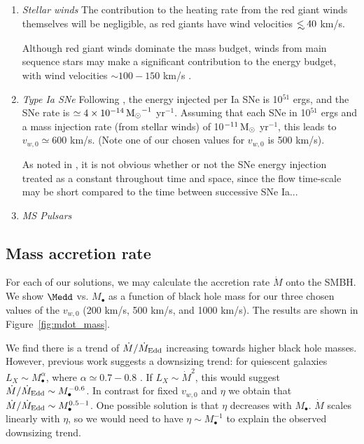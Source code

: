 \documentclass[usenatbib,fleqn]{mn2e}
\newcommand{\eddr}{\dot{M}/\dot{M}_{\rm Edd}}
\newcommand\lsim{\mathrel{\rlap{\lower4pt\hbox{\hskip1pt$\sim$}}
        \raise1pt\hbox{$<$}}}
\newcommand{\Mbh}[1][]{M_{\bullet#1}}
\newcommand{\vwO}{v_{w,0}}
\begin{document}
\begin{enumerate}
\item \emph{Stellar winds} The contribution to the heating rate from the red giant winds themselves will be negligible, as red giants have wind velocities $\lsim 40$ km/s.

Although red giant winds dominate the mass budget, winds from main sequence stars may make a significant contribution to the energy budget, with wind velocities $\sim 100-150$ km/s \citep{NaimanSoares-Furtado+:2013a}. 

\item \emph{Type Ia SNe} Following \citealt{ShcherbakovWong+:2014a}, the energy injected per Ia SNe is 10$^{51}$ ergs, and the SNe rate is $\simeq 4 \times 10^{-14} \,{\rm M_\odot}^{-1}$ yr$^{-1}$.  Assuming that each SNe in 10$^{51}$ ergs and a mass injection rate (from stellar winds) of 10$^{-11} \,{\rm M_\odot}$  yr$^{-1}$, this leads to $\vwO\simeq 600$ km/s.  (Note one of our chosen values for $\vwO$ is 500 km/s).

As noted in \citealt{ShcherbakovWong+:2014a}, it is not obvious whether or not the SNe energy injection treated as a constant throughout time and space, since the flow time-scale may be short compared to the time between successive SNe Ia...
\item \emph{MS Pulsars} 
\end{enumerate}


\subsection{Mass accretion rate}
For each of our solutions, we may calculate the accretion rate $\dot{M}$ onto the SMBH. We show $\Medd$ vs. $\Mbh$ as a function of black hole mass for our three  chosen values of the $\vwO$ (200 km/s, 500 km/s, and 1000 km/s). The results are shown in Figure~\ref{fig:mdot_mass}. 

We find there is a trend of $\eddr$ increasing towards higher black hole masses. However, previous work  suggests a downsizing trend: for quiescent galaxies $L_X \sim \Mbh^\alpha$, where $\alpha\simeq 0.7-0.8$ \citep{MillerGallo+:2014a}. If $L_X\sim\dot{M}^2$, this would suggest $\eddr\sim \Mbh^{-0.6}$. In contrast for fixed $\vwO$ and $\eta$ we obtain that $\eddr\sim \Mbh^{0.5-1}$. One possible solution is that $\eta$ decreases with $\Mbh$. $\dot{M}$ scales linearly with $\eta$, so we would need to have $\eta\sim \Mbh^{-1}$ to explain the observed downsizing trend.  
\end{document}
